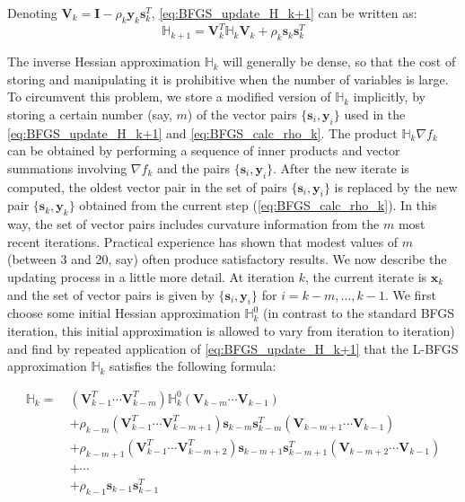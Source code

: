 Denoting $\textbf{V}_k = \textbf{I} - \rho_k\textbf{y}_k\textbf{s}_k^T$, \cref{eq:BFGS_update_H_k+1} can be written as:
\begin{equation}
  \mathbb{H}_{k+1} = \textbf{V}_k^T \mathbb{H}_{k} \textbf{V}_k +\rho_k\textbf{s}_k\textbf{s}_k^T
\end{equation}

The inverse Hessian approximation $\mathbb{H}_{k}$ will generally be dense, so that the cost of storing and manipulating it is prohibitive when the number of variables is large. To circumvent this problem, we store a modified version of $\mathbb{H}_{k}$ implicitly, by storing a certain number (say, $m$) of the vector pairs $\{\textbf{s}_i, \textbf{y}_i\}$ used in the \cref{eq:BFGS_update_H_k+1} and \cref{eq:BFGS_calc_rho_k}. The product $\mathbb{H}_{k} \nabla f_k$ can be obtained by performing a sequence of inner products and vector summations involving $\nabla f_k$ and the pairs $\{\textbf{s}_i, \textbf{y}_i\}$. After the new iterate is computed, the oldest vector pair in the set of pairs $\{\textbf{s}_i, \textbf{y}_i\}$ is replaced by the new pair $\{\textbf{s}_k, \textbf{y}_k\}$ obtained from the current step (\cref{eq:BFGS_calc_rho_k}). In this way, the set of vector pairs includes curvature information from the $m$ most recent iterations. Practical experience has shown that modest values of $m$ (between 3 and 20, say) often produce satisfactory results. We now describe the updating process in a little more detail. At iteration $k$, the current iterate is $\textbf{x}_k$ and the set of vector pairs is given by $\{\textbf{s}_i, \textbf{y}_i\}$ for $i=k-m,\ldots,k-1$. We first choose some initial Hessian approximation $\mathbb{H}_{k}^0$ (in contrast to the standard BFGS iteration, this initial approximation is allowed to vary from iteration to iteration) and find by repeated application of \cref{eq:BFGS_update_H_k+1} that the L-BFGS approximation $\mathbb{H}_{k}$ satisfies the following formula: \cite{Nocedal2006}

\begin{align}
  \mathbb{H}_{k} =\  & (\textbf{V}_{k-1}^T \cdots \textbf{V}_{k-m}^T) \mathbb{H}_{k}^0 (\textbf{V}_{k-m} \cdots \textbf{V}_{k-1})                                  \nonumber          \\
                     & + \rho_{k-m} (\textbf{V}_{k-1}^T \cdots \textbf{V}_{k-m+1}^T) \textbf{s}_{k-m} \textbf{s}_{k-m}^T (\textbf{V}_{k-m+1} \cdots \textbf{V}_{k-1}) \nonumber       \\
                     & + \rho_{k-m+1} (\textbf{V}_{k-1}^T \cdots \textbf{V}_{k-m+2}^T) \textbf{s}_{k-m+1} \textbf{s}_{k-m+1}^T (\textbf{V}_{k-m+2} \cdots \textbf{V}_{k-1}) \nonumber \\
                     & + \cdots \nonumber                                                                                                                                             \\
                     & + \rho_{k-1} \textbf{s}_{k-1} \textbf{s}_{k-1}^T
\end{align}

